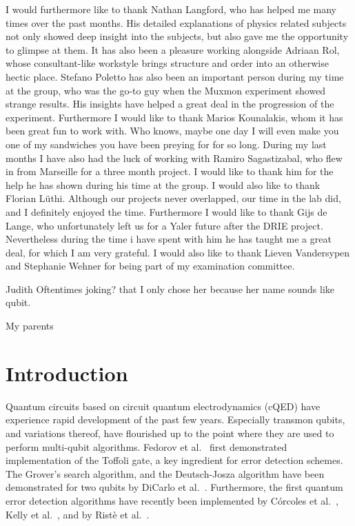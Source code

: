 \documentclass[12pt]{report}
\newcommand\blankpage{%
    \null
    \thispagestyle{empty}%
    \addtocounter{page}{-1}%
    \newpage}
\begin{document}
I would furthermore like to thank Nathan Langford, who has helped me many times over the past months. His detailed explanations of physics related subjects not only showed deep insight into the subjects, but also gave me the opportunity to glimpse at them. It has also been a pleasure working alongside Adriaan Rol, whose consultant-like workstyle brings structure and order into an otherwise hectic place. Stefano Poletto has also been an important person during my time at the group, who was the go-to guy when the Muxmon experiment showed strange results. His insights have helped a great deal in the progression of the experiment. Furthermore I would like to thank Marios Kounalakis, whom it has been great fun to work with. Who knows, maybe one day I will even make you one of my sandwiches you have been preying for for so long. During my last months I have also had the luck of working with Ramiro Sagastizabal, who flew in from Marseille for a three month project. I would like to thank him for the help he has shown during his time at the group. I would also like to thank Florian L\"uthi. Although our projects never overlapped, our time in the lab did, and I definitely enjoyed the time. Furthermore I would like to thank Gijs de Lange, who unfortunately left us for a Yaler future after the DRIE project. Nevertheless during the time i have spent with him he has taught me a great deal, for which I am very grateful. I would also like to thank Lieven Vandersypen and Stephanie Wehner for being part of my examination committee.


Judith
Oftentimes joking? that I only chose her because her name sounds like qubit.

My parents


\blankpage
\tableofcontents
\newpage

\sectionfont{\scshape}



\chapter{Introduction}

  Quantum circuits based on circuit quantum electrodynamics (cQED) have experience rapid development of the past few years. Especially transmon qubits, and variations thereof, have flourished up to the point where they are used to perform multi-qubit algorithms. Fedorov et al.~\cite{fedorov2011implementation} first demonstrated implementation of the Toffoli gate, a key ingredient for error detection schemes. The Grover's search algorithm, and the Deutsch-Josza algorithm have been demonstrated for two qubits by DiCarlo et al.~\cite{dicarlo2009demonstration}. Furthermore, the first quantum error detection algorithms have recently been implemented by C\'orcoles et al.~\cite{corcoles2015demonstration}, Kelly et al.~\cite{kelly2015state}, and by Rist\`e et al.~\cite{riste2014detecting}.
\end{document}
